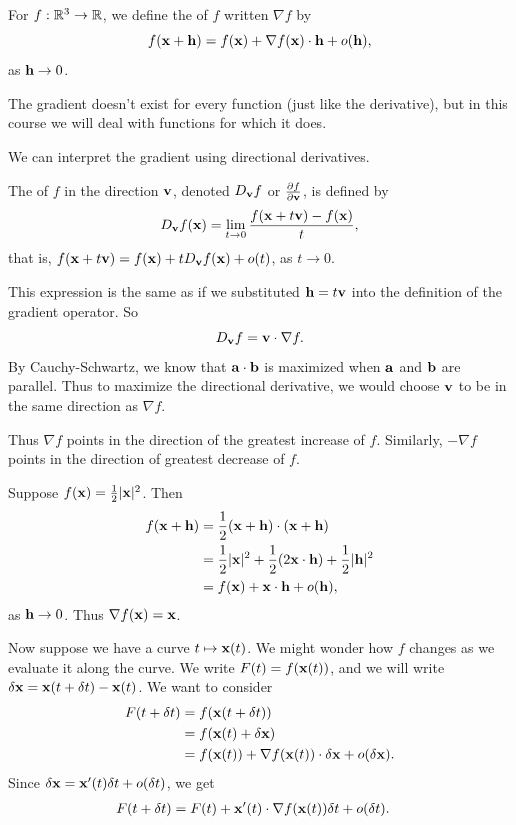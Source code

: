 \documentclass[a4paper]{scrartcl}
\begin{document}
\begin{definition}[Gradient]
	For $f : \mathbb{R}^3 \rightarrow \mathbb{R}$, we define the  of $f$ written $\nabla f$ by
	$$
	f(\mathbf{x} + \mathbf{h}) = f(\mathbf{x}) + \nabla f(\mathbf{x}) \cdot \mathbf{h} + o(\mathbf{h}),
	$$
	as $\mathbf{h} \rightarrow 0$.
\end{definition}

The gradient doesn't exist for every function (just like the derivative), but in this course we will deal with functions for which it does.

We can interpret the gradient using directional derivatives.
\begin{definition}
	The  of $f$ in the direction $\mathbf{v}$, denoted $D_{\mathbf{v}} f$ or $\frac{\partial f}{\partial \mathbf{v}}$, is defined by
	$$
	D_{\mathbf{v}} f(\mathbf{x}) = \lim_{t\to 0} \frac{f(\mathbf{x} + t \mathbf{v}) - f(\mathbf{x})}{t},
	$$
	that is, $f(\mathbf{x} + t \mathbf{v}) = f(\mathbf{x}) + t D_{\mathbf{v}} f(\mathbf{x}) + o(t)$, as $t \rightarrow 0$.
\end{definition}

This expression is the same as if we substituted  $\mathbf{h} = t \mathbf{v}$ into the definition of the gradient operator.
So
$$
D_{\mathbf{v}} f = \mathbf{v} \cdot \nabla f.
$$
By Cauchy-Schwartz, we know that $\mathbf{a} \cdot \mathbf{b}$ is maximized when $\mathbf{a}$ and $\mathbf{b}$ are parallel. Thus to maximize the directional derivative, we would choose $\mathbf{v}$ to be in the same direction as $\nabla f$.

Thus $\nabla f$ points in the direction of the greatest increase of $f$.  Similarly, $- \nabla f$ points in the direction of greatest decrease of $f$.

\begin{example}
	Suppose $f(\mathbf{x}) = \frac{1}{2}| \mathbf{x}|^2$. Then
	\begin{align*}
		f(\mathbf{x} + \mathbf{h}) &= \frac{1}{2}(\mathbf{x} + \mathbf{h}) \cdot (\mathbf{x} + \mathbf{h})\\
		&= \frac{1}{2} |\mathbf{x}|^2 + \frac{1}{2}(2 \mathbf{x} \cdot \mathbf{h}) + \frac{1}{2}|\mathbf{h}|^2 \\
		&= f(\mathbf{x}) + \mathbf{x}\cdot \mathbf{h} + o(\mathbf{h}),
	\end{align*}
	as $\mathbf{h} \rightarrow 0$. Thus $\nabla f(\mathbf{x}) = \mathbf{x}$.
\end{example}

Now suppose we have a curve $t \mapsto \mathbf{x}(t)$. We might wonder how $f$ changes as we evaluate it along the curve. We write $F(t) = f(\mathbf{x}(t))$, and we will write $\delta \mathbf{x} = \mathbf{x}(t + \delta t) - \mathbf{x}(t)$. We want to consider 
\begin{align*}
	F(t + \delta t) &= f(\mathbf{x}(t + \delta t))\\
	 &= f(\mathbf{x}(t) + \delta 
	 \mathbf{x}) \\
	 &= f(\mathbf{x}(t)) + \nabla f(\mathbf{x}(t)) \cdot \delta \mathbf{x} + o(\delta \mathbf{x}). 
\end{align*}
Since $\delta \mathbf{x} = \mathbf{x}'(t) \delta t + o(\delta t)$, we get
\begin{align*}
	F(t + \delta t) &= F(t) + \mathbf{x}'(t) \cdot \nabla f(\mathbf{x}(t)) \delta t + o(\delta t).
\end{align*}
\end{document}
